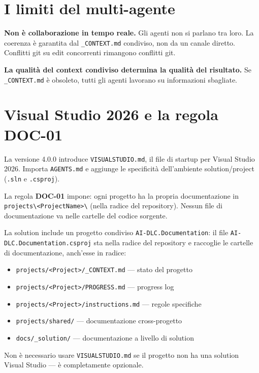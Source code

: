 \section{I limiti del multi-agente}
\label{sec:14-limiti}

\textbf{Non è collaborazione in tempo reale.} Gli agenti non si parlano tra loro. La coerenza è garantita dal \texttt{\_CONTEXT.md} condiviso, non da un canale diretto. Conflitti git su edit concorrenti rimangono conflitti git.

\textbf{La qualità del context condiviso determina la qualità del risultato.} Se \texttt{\_CONTEXT.md} è obsoleto, tutti gli agenti lavorano su informazioni sbagliate.

\section{Visual Studio 2026 e la regola DOC-01}
\label{sec:14-visualstudio}

La versione 4.0.0 introduce \texttt{VISUALSTUDIO.md}, il file di startup per Visual Studio 2026. Importa \texttt{AGENTS.md} e aggiunge le specificità dell'ambiente solution/project (\texttt{.sln} e \texttt{.csproj}).

La regola \textbf{DOC-01} impone: ogni progetto ha la propria documentazione in \texttt{projects\textbackslash <ProjectName>\textbackslash} (nella radice del repository). Nessun file di documentazione va nelle cartelle del codice sorgente.

La solution include un progetto condiviso \texttt{AI-DLC.Documentation}: il file \texttt{AI-DLC.Documentation.csproj} sta nella radice del repository e raccoglie le cartelle di documentazione, anch'esse in radice:
\begin{itemize}
  \item \texttt{projects/<Project>/\_CONTEXT.md} --- stato del progetto
  \item \texttt{projects/<Project>/PROGRESS.md} --- progress log
  \item \texttt{projects/<Project>/instructions.md} --- regole specifiche
  \item \texttt{projects/shared/} --- documentazione cross-progetto
  \item \texttt{docs/\_solution/} --- documentazione a livello di solution
\end{itemize}

Non è necessario usare \texttt{VISUALSTUDIO.md} se il progetto non ha una solution Visual Studio --- è completamente opzionale.

